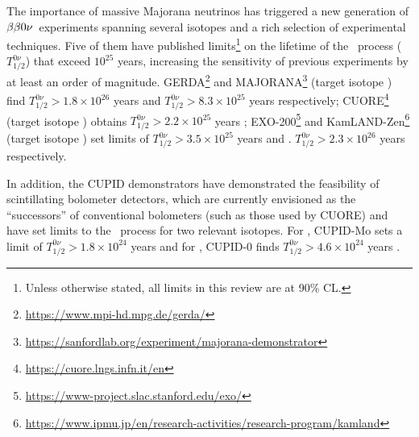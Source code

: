 The importance of massive Majorana neutrinos 
has triggered a new generation of $\beta\beta0\nu$~experiments spanning several isotopes and a rich selection of experimental techniques.
%
Five of them have published limits\footnote{Unless otherwise stated, all limits in this review are at 90\% CL.}
 on the lifetime of the \bbonu\ process ($T^{0\nu}_{1/2}$) that exceed $10^{25}$ years, increasing the sensitivity of previous  experiments by at least an order of magnitude. GERDA\footnote{\url{https://www.mpi-hd.mpg.de/gerda/}} and MAJORANA\footnote{\url{https://sanfordlab.org/experiment/majorana-demonstrator}} (target isotope ) find \mbox{$T^{0\nu}_{1/2} > 1.8 \times 10^{26}$} years \cite{GERDA:2020xhi} and \mbox{$T^{0\nu}_{1/2} > 8.3 \times 10^{25}$} years \cite{Majorana:2022udl} respectively; CUORE\footnote{\url{https://cuore.lngs.infn.it/en}} (target isotope ) obtains \mbox{$T^{0\nu}_{1/2} > 2.2 \times 10^{25}$} years \cite{CUORE:2021mvw}; EXO-200\footnote{\url{https://www-project.slac.stanford.edu/exo/}} and KamLAND-Zen\footnote{\url{https://www.ipmu.jp/en/research-activities/research-program/kamland}} (target isotope ) set limits of \mbox{$T^{0\nu}_{1/2} > 3.5 \times 10^{25}$} years \cite{EXO-200:2019rkq} and . \mbox{$T^{0\nu}_{1/2} > 2.3 \times 10^{26}$} years \cite{KamLAND-Zen:2022tow} respectively. 
 
 In addition, the CUPID demonstrators have demonstrated the feasibility of scintillating bolometer detectors, which are currently envisioned as the ``successors'' of conventional bolometers (such as those used by CUORE) and have set limits to the \bbonu\ process for two relevant isotopes.
For , CUPID-Mo sets a limit of \mbox{$T^{0\nu}_{1/2} > 1.8 \times 10^{24}$} years \cite{Augier:2022znx}
and for , CUPID-0 finds \mbox{$T^{0\nu}_{1/2} > 4.6 \times 10^{24}$} years \cite{CUPID:2022puj}. 

